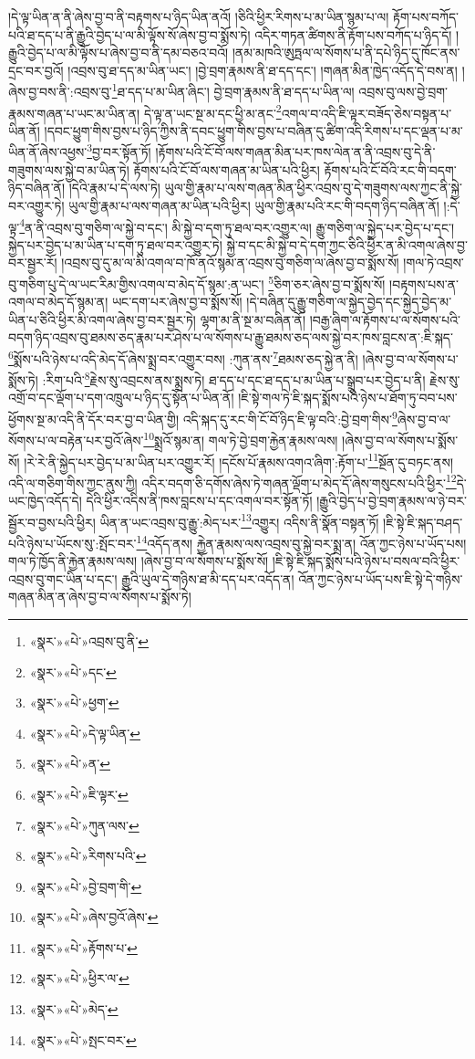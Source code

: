 །དེ་ལྟ་ཡིན་ན་ནི་ཞེས་བྱ་བ་ནི་བརྟགས་པ་ཉིད་ཡིན་ནའོ། །ཅིའི་ཕྱིར་རིགས་པ་མ་ཡིན་སྙམ་པ་ལ། རྟོག་པས་བཀོད་པའི་ཐ་དད་པ་ནི་རྒྱུའི་བྱེད་པ་ལ་མི་ལྟོས་སོ་ཞེས་བྱ་བ་སྨོས་ཏེ། འདིར་གཏན་ཚིགས་ནི་རྟོག་པས་བཀོད་པ་ཉིད་དོ། །རྒྱུའི་བྱེད་པ་ལ་མི་ལྟོས་པ་ཞེས་བྱ་བ་ནི་དམ་བཅའ་བའོ། །ནམ་མཁའི་ཨུཏྤལ་ལ་སོགས་པ་ནི་དཔེ་ཉིད་དུ་ཁོང་ནས་དྲང་བར་བྱའོ། །འབྲས་བུ་ཐ་དད་མ་ཡིན་ཡང་། །བྱེ་བྲག་རྣམས་ནི་ཐ་དད་དང་། །གཞན་མིན་ཁྱེད་འདོད་དེ་བས་ན། །ཞེས་བྱ་བས་ནི་:འབྲས་བུ་\footnote{«སྣར་»«པེ་»འབྲས་བུ་ནི་}ཐ་དད་པ་མ་ཡིན་ཞིང་། བྱེ་བྲག་རྣམས་ནི་ཐ་དད་པ་ཡིན་ལ། འབྲས་བུ་ལས་བྱེ་བྲག་རྣམས་གཞན་པ་ཡང་མ་ཡིན་ན། དེ་ལྟ་ན་ཡང་སྔ་མ་དང་ཕྱི་མ་ནང་\footnote{«སྣར་»«པེ་»དང་}འགལ་བ་འདི་ཇི་ལྟར་བཟོད་ཅེས་བསྟན་པ་ཡིན་ནོ། །དབང་ཕྱུག་གིས་བྱས་པ་ཉིད་ཀྱིས་ནི་དབང་ཕྱུག་གིས་བྱས་པ་བཞིན་དུ་ཚིག་འདི་རིགས་པ་དང་ལྡན་པ་མ་ཡིན་ནོ་ཞེས་འཕྱས་\footnote{«སྣར་»«པེ་»ཕྱག་}བྱ་བར་སྟོན་ཏོ། །རྟོགས་པའི་ངོ་བོ་ལས་གཞན་མིན་པར་ཁས་ལེན་ན་ནི་འབྲས་བུ་དེ་ནི་གཟུགས་ལས་སྐྱེ་བ་མ་ཡིན་ཏེ། རྟོགས་པའི་ངོ་བོ་ལས་གཞན་མ་ཡིན་པའི་ཕྱིར། རྟོགས་པའི་ངོ་བོའི་རང་གི་བདག་ཉིད་བཞིན་ནོ། །དེའི་རྣམ་པ་དེ་ལས་ཏེ། ཡུལ་གྱི་རྣམ་པ་ལས་གཞན་མིན་ཕྱིར་འབྲས་བུ་དེ་གཟུགས་ལས་ཀྱང་ནི་སྐྱེ་བར་འགྱུར་ཏེ། ཡུལ་གྱི་རྣམ་པ་ལས་གཞན་མ་ཡིན་པའི་ཕྱིར། ཡུལ་གྱི་རྣམ་པའི་རང་གི་བདག་ཉིད་བཞིན་ནོ། །:དེ་ལྟ་\footnote{«སྣར་»«པེ་»དེ་ལྟ་ཡིན་}ན་ནི་འབྲས་བུ་གཅིག་ལ་སྐྱེ་བ་དང་། མི་སྐྱེ་བ་དག་ཏུ་ཐལ་བར་འགྱུར་ལ། རྒྱུ་གཅིག་ལ་སྐྱེད་པར་བྱེད་པ་དང་། སྐྱེད་པར་བྱེད་པ་མ་ཡིན་པ་དག་ཏུ་ཐལ་བར་འགྱུར་ཏེ། སྐྱེ་བ་དང་མི་སྐྱེ་བ་དེ་དག་ཀྱང་ཅིའི་ཕྱིར་ན་མི་འགལ་ཞེས་བྱ་བར་སྦྱར་རོ། །འབྲས་བུ་དུ་མ་ལ་མི་འགལ་བ་ཁོ་ནའོ་སྙམ་ན་འབྲས་བུ་གཅིག་ལ་ཞེས་བྱ་བ་སྨོས་སོ། །གལ་ཏེ་འབྲས་བུ་གཅིག་པུ་དེ་ལ་ཡང་རིམ་གྱིས་འགལ་བ་མེད་དོ་སྙམ་:ན་ཡང་། \footnote{«སྣར་»«པེ་»ན་}ཅིག་ཅར་ཞེས་བྱ་བ་སྨོས་སོ། །བརྟགས་པས་ན་འགལ་བ་མེད་དོ་སྙམ་ན། ཡང་དག་པར་ཞེས་བྱ་བ་སྨོས་སོ། །དེ་བཞིན་དུ་རྒྱུ་གཅིག་ལ་སྐྱེད་བྱེད་དང་སྐྱེད་བྱེད་མ་ཡིན་པ་ཅིའི་ཕྱིར་མི་འགལ་ཞེས་བྱ་བར་སྦྱར་ཏེ། ལྷག་མ་ནི་སྔ་མ་བཞིན་ནོ། །བརྒྱ་ཞིག་ལ་རྟོགས་པ་ལ་སོགས་པའི་བདག་ཉིད་འབྲས་བུ་ཐམས་ཅད་རྣམ་པར་ཤེས་པ་ལ་སོགས་པ་རྒྱུ་ཐམས་ཅད་ལས་སྐྱེ་བར་ཁས་བླངས་ན་:ཇི་སྐད་\footnote{«སྣར་»«པེ་»ཇི་ལྟར་}སྨོས་པའི་ཉེས་པ་འདི་མེད་དོ་ཞེས་སྨྲ་བར་འགྱུར་བས། :ཀུན་ནས་\footnote{«སྣར་»«པེ་»ཀུན་ལས་}ཐམས་ཅད་སྐྱེ་ན་ནི། །ཞེས་བྱ་བ་ལ་སོགས་པ་སྨོས་ཏེ། :རིག་པའི་\footnote{«སྣར་»«པེ་»རིགས་པའི་}རྗེས་སུ་འབྲངས་ནས་སྨྲས་ཏེ། ཐ་དད་པ་དང་ཐ་དད་པ་མ་ཡིན་པ་སྒྲུབ་པར་བྱེད་པ་ནི། རྗེས་སུ་འགྲོ་བ་དང་ལྡོག་པ་དག་འཁྲུལ་པ་ཉིད་དུ་སྟོན་པ་ཡིན་ནོ། །ཇི་སྟེ་གལ་ཏེ་ཇི་སྐད་སྨོས་པའི་ཉེས་པ་ཐོག་ཏུ་བབ་པས་ཕྱོགས་སྔ་མ་འདི་ནི་དོར་བར་བྱ་བ་ཡིན་གྱི། འདི་སྐད་དུ་རང་གི་ངོ་བོ་ཉིད་ཇི་ལྟ་བའི་:བྱེ་བྲག་གིས་\footnote{«སྣར་»«པེ་»བྱེ་བྲག་གི་}ཞེས་བྱ་བ་ལ་སོགས་པ་ལ་བརྟེན་པར་བྱའོ་ཞེས་\footnote{«སྣར་»«པེ་»ཞེས་བྱའོ་ཞེས་}སྨྲའོ་སྙམ་ན། གལ་ཏེ་བྱེ་བྲག་རྐྱེན་རྣམས་ལས། །ཞེས་བྱ་བ་ལ་སོགས་པ་སྨོས་སོ། །རེ་རེ་ནི་སྐྱེད་པར་བྱེད་པ་མ་ཡིན་པར་འགྱུར་རོ། །དངོས་པོ་རྣམས་འགའ་ཞིག་:རྟོག་པ་\footnote{«སྣར་»«པེ་»རྟོགས་པ་}སྔོན་དུ་བཏང་ནས། འདི་ལ་གཅིག་གིས་ཀྱང་ནུས་ཀྱི། འདིར་བདག་ཅི་དགོས་ཞེས་ཏེ་གཞན་ལྡོག་པ་མེད་དོ་ཞེས་གསུངས་པའི་ཕྱིར་\footnote{«སྣར་»«པེ་»ཕྱིར་ལ་}དེ་ཡང་ཁྱེད་འདོད་དེ། དེའི་ཕྱིར་འདིས་ནི་ཁས་བླངས་པ་དང་འགལ་བར་སྟོན་ཏོ། །རྒྱུའི་བྱེད་པ་བྱེ་བྲག་རྣམས་ལ་ཉེ་བར་སྦྱོར་བ་བྱས་པའི་ཕྱིར། ཡིན་ན་ཡང་འབྲས་བུ་རྒྱུ་:མེད་པར་\footnote{«སྣར་»«པེ་»མེད་}འགྱུར། འདིས་ནི་སྣོན་བསྟན་ཏོ། །ཇི་སྟེ་ཇི་སྐད་བཤད་པའི་ཉེས་པ་ཡོངས་སུ་:སྤོང་བར་\footnote{«སྣར་»«པེ་»སྤང་བར་}འདོད་ནས། རྐྱེན་རྣམས་ལས་འབྲས་བུ་སྐྱེ་བར་སྨྲ་ན། འོན་ཀྱང་ཉེས་པ་ཡོད་པས། གལ་ཏེ་ཁྱོད་ནི་རྐྱེན་རྣམས་ལས། །ཞེས་བྱ་བ་ལ་སོགས་པ་སྨོས་སོ། །ཇི་སྟེ་ཇི་སྐད་སྨོས་པའི་ཉེས་པ་བསལ་བའི་ཕྱིར་འབྲས་བུ་གང་ཡིན་པ་དང་། རྒྱུའི་ཡུལ་དེ་གཉིས་ཐ་མི་དད་པར་འདོད་ན། འོན་ཀྱང་ཉེས་པ་ཡོད་པས་ཇི་སྟེ་དེ་གཉིས་གཞན་མིན་ན་ཞེས་བྱ་བ་ལ་སོགས་པ་སྨོས་ཏེ། 